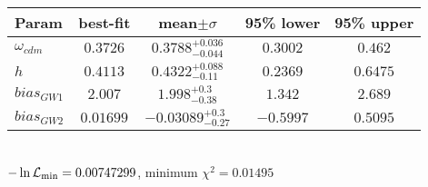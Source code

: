 \begin{tabular}{|l|c|c|c|c|} 
 \hline 
Param & best-fit & mean$\pm\sigma$ & 95\% lower & 95\% upper \\ \hline 
$\omega_{cdm }$ &$0.3726$ & $0.3788_{-0.044}^{+0.036}$ & $0.3002$ & $0.462$ \\ 
$h$ &$0.4113$ & $0.4322_{-0.11}^{+0.088}$ & $0.2369$ & $0.6475$ \\ 
$bias_{GW 1 }$ &$2.007$ & $1.998_{-0.38}^{+0.3}$ & $1.342$ & $2.689$ \\ 
$bias_{GW 2 }$ &$0.01699$ & $-0.03089_{-0.27}^{+0.3}$ & $-0.5997$ & $0.5095$ \\ 
\hline 
 \end{tabular} \\ 
$-\ln{\cal L}_\mathrm{min} =0.00747299$, minimum $\chi^2=0.01495$ \\ 
